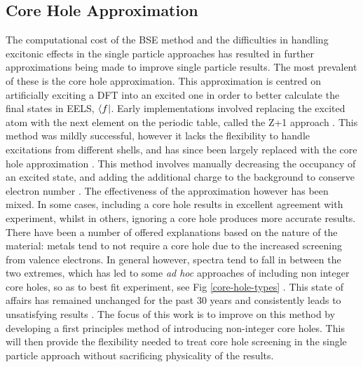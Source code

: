 \subsection{Core Hole Approximation} \label{Core Hole Approximation}
The computational cost of the BSE method and the difficulties in handling excitonic effects in the single particle approaches has resulted in further approximations being made to improve single particle results.  The most prevalent of these is the core hole approximation.  This approximation is centred on artificially exciting a DFT into an excited one in order to better calculate the final states in EELS, $\bra{f}$.  Early implementations involved replacing the excited atom with the next element on the periodic table, called the Z+1 approach \cite{lee_new_1977}.  This method was mildly successful, however it lacks the flexibility to handle excitations from different shells, and has since been largely replaced with the core hole approximation \cite{hebert_practical_2007}.  This method involves manually decreasing the occupancy of an excited state, and adding the additional charge to the background to conserve electron number \cite{wien2k}. The effectiveness of the approximation however has been mixed.  In some cases, including a core hole results in excellent agreement with experiment, whilst in others, ignoring a core hole produces more accurate results.  There have been a number of offered explanations based on the nature of the material: metals tend to not require a core hole due to the increased screening from valence electrons. In general however, spectra tend to fall in between the two extremes, which has led to some \textit{ad hoc} approaches of including non integer core holes, so as to best fit experiment, see Fig \ref{core-hole-types} \cite{hebert_practical_2007, luitz_partial_2001, hebert_improvement_2003}. This state of affairs has remained unchanged for the past 30 years and consistently leads to unsatisfying results \cite{ brydson_further_1988, hardcastle_robust_2017,bad_hole1,bad_hole2, bad_hole3, bad_hole4, bad_hole5, bad_hole6, bad_hole7, bad_hole8,bad_hole9, bad_hole10}.  The focus of this work is to improve on this method by developing a first principles method of introducing non-integer core holes. This will then provide the flexibility needed to treat core hole screening in the single particle approach without sacrificing physicality of the results.


